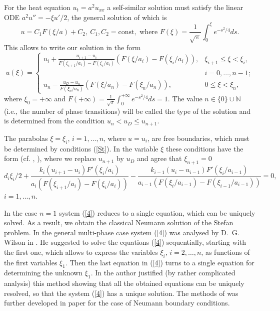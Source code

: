 \documentclass[12pt]{article}
\theoremstyle{plain}
\theoremstyle{definition}
\numberwithin{equation}{section}
\newcommand{\N}{{\mathbb N}}
\newcommand{\const}{\mathrm{const}}
\begin{document}
For the heat equation
$u_t=a^2 u_{xx}$ a self-similar solution must satisfy the linear ODE $a^2u''=-\xi u'/2$, the general solution of which is
\[
u=C_1F(\xi/a)+C_2, \ C_1,C_2=\const, \mbox{ where } F(\xi)=\frac{1}{\sqrt{\pi}}\int_0^\xi e^{-s^2/4}ds.
\]
This allows to write our solution in the form
\begin{equation}\label{3}
u(\xi)=\left\{\begin{array}{lr} u_i+\frac{u_{i+1}-u_i}{F(\xi_{i+1}/a_i)-F(\xi_i/a_i)}(F(\xi/a_i)-F(\xi_i/a_i)), &
\xi_{i+1}\le\xi<\xi_i, \\ & i=0,\ldots,n-1; \\
u_n-\frac{u_D-u_n}{F(\xi_n/a_n)}(F(\xi/a_n)-F(\xi_n/a_n)), & 0\le\xi<\xi_n,
\end{array}\right.
\end{equation}
where $\xi_0=+\infty$ and $\displaystyle F(+\infty)=\frac{1}{\sqrt{\pi}}\int_0^{+\infty} e^{-s^2/4}ds=1$.
The value $n\in\{0\}\cup\N$ (i.e., the number of phase transitions) will be called the type of the solution and is determined from the condition $u_n<u_D\le u_{n+1}$.

The parabolas $\xi=\xi_i$, $i=1,\ldots,n$, where $u=u_i$, are free boundaries, which must be determined by conditions (\ref{St}).
In the variable $\xi$ these conditions have the form (cf. \cite[Chapter XI]{CJ}, \cite{Wil}), where we replace $u_{n+1}$ by $u_D$ and agree that $\xi_{n+1}=0$
\begin{equation}\label{4}
d_i\xi_i/2+\frac{k_i(u_{i+1}-u_i)F'(\xi_i/a_i)}{a_i(F(\xi_{i+1}/a_i)-F(\xi_i/a_i))}-
\frac{k_{i-1}(u_i-u_{i-1})F'(\xi_i/a_{i-1})}{a_{i-1}(F(\xi_i/a_{i-1})-F(\xi_{i-1}/a_{i-1}))}=0,
\end{equation}
$i=1,\ldots,n$.

In the case $n=1$ system (\ref{4}) reduces to a single equation, which can be uniquely solved. As a result, we obtain the classical Neumann solution of the Stefan problem.
In the general multi-phase case system (\ref{4}) was analysed by D.~G. Wilson in \cite{Wil}. He suggested
to solve the equations (\ref{4}) sequentially, starting with the first one, which allows to express the variables
$\xi_i$, $i=2,\ldots,n$, as functions of the first variables $\xi_1$. Then the last equation in (\ref{4}) turns to a single equation for determining the unknown $\xi_1$. In \cite{Wil} the author justified (by rather complicated analysis) this method showing that all the obtained  equations can be uniquely resolved, so that the system (\ref{4}) has a unique solution. The methods of \cite{Wil} was further developed in paper \cite{ST} for the case of Neumann boundary conditions.
\end{document}
